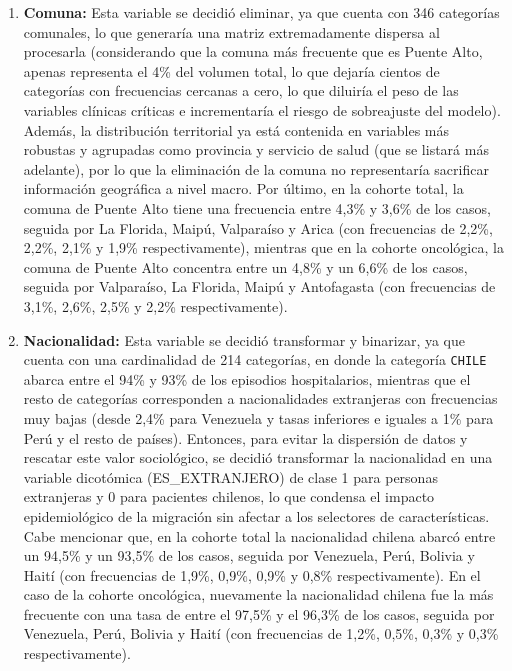 \begin{enumerate}
    \item \textbf{Comuna:} Esta variable se decidió eliminar, ya que cuenta con 346 categorías comunales, lo que generaría una matriz extremadamente dispersa al procesarla (considerando que la comuna más frecuente que es Puente Alto, apenas representa el 4\% del volumen total, lo que dejaría cientos de categorías con frecuencias cercanas a cero, lo que diluiría el peso de las variables clínicas críticas e incrementaría el riesgo de sobreajuste del modelo). Además, la distribución territorial ya está contenida en variables más robustas y agrupadas como provincia y servicio de salud (que se listará más adelante), por lo que la eliminación de la comuna no representaría sacrificar información geográfica a nivel macro. Por último, en la cohorte total, la comuna de Puente Alto tiene una frecuencia entre 4,3\% y 3,6\% de los casos, seguida por La Florida, Maipú, Valparaíso y Arica (con frecuencias de 2,2\%, 2,2\%, 2,1\% y 1,9\% respectivamente), mientras que en la cohorte oncológica, la comuna de Puente Alto concentra entre un 4,8\% y un 6,6\% de los casos, seguida por Valparaíso, La Florida, Maipú y Antofagasta (con frecuencias de 3,1\%, 2,6\%, 2,5\% y 2,2\% respectivamente).
    \item \textbf{Nacionalidad:} Esta variable se decidió transformar y binarizar, ya que cuenta con una cardinalidad de 214 categorías, en donde la categoría \texttt{CHILE} abarca entre el 94\% y 93\% de los episodios hospitalarios, mientras que el resto de categorías corresponden a nacionalidades extranjeras con frecuencias muy bajas (desde 2,4\% para Venezuela y tasas inferiores e iguales a 1\% para Perú y el resto de países). Entonces, para evitar la dispersión de datos y rescatar este valor sociológico, se decidió transformar la nacionalidad en una variable dicotómica (ES\_EXTRANJERO) de clase 1 para personas extranjeras y 0 para pacientes chilenos, lo que condensa el impacto epidemiológico de la migración sin afectar a los selectores de características. Cabe mencionar que, en la cohorte total la nacionalidad chilena abarcó entre un 94,5\% y un 93,5\% de los casos, seguida por Venezuela, Perú, Bolivia y Haití (con frecuencias de 1,9\%, 0,9\%, 0,9\% y 0,8\% respectivamente). En el caso de la cohorte oncológica, nuevamente la nacionalidad chilena fue la más frecuente con una tasa de entre el 97,5\% y el 96,3\% de los casos, seguida por Venezuela, Perú, Bolivia y Haití (con frecuencias de 1,2\%, 0,5\%, 0,3\% y 0,3\% respectivamente).

\end{enumerate}
